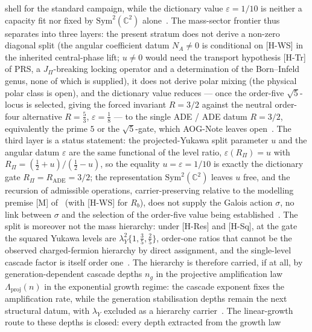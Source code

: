 \documentclass[11pt,a4paper]{article}
\begin{document}
    shell for the standard campaign,
    while the dictionary value $\varepsilon = 1/10$ is neither a capacity fit nor fixed by
    $\mathrm{Sym}^2(\mathbb{C}^2)$
    alone~\cite{Beau2026aar, Beau2026aog}.
    The mass-sector frontier thus separates into three layers: the present stratum does not derive a non-zero diagonal
    split (the angular coefficient datum $N_A \neq 0$ is conditional on [H-WS] in the inherited central-phase lift;
    $u \neq 0$ would need the transport hypothesis [H-Tr] of PRS, a $J_\Pi$-breaking locking operator and a
    determination of the Born--Infeld genus, none of which is supplied), it does not derive polar mixing (the physical polar class is
    open), and the
    dictionary value reduces --- once the order-five $\sqrt{5}$-locus is selected, giving the forced invariant $R = 3/2$
    against the neutral order-four alternative $R = \tfrac53$, $\varepsilon = \tfrac18$ --- to the single ADE /
    ADE datum $R = 3/2$, equivalently the prime $5$ or the $\sqrt{5}$-gate, which AOG-Note leaves open~\cite{Beau2026aog}.
    The third layer is a status statement: the projected-Yukawa split parameter $u$ and the angular datum
    $\varepsilon$ are the same functional of the level ratio, $\varepsilon(R_\Pi) = u$ with $R_\Pi =
    (\tfrac12+u)/(\tfrac12-u)$, so the equality $u = \varepsilon = 1/10$ is exactly the dictionary gate $R_\Pi =
    R_{\mathrm{ADE}} = 3/2$; the representation $\mathrm{Sym}^2(\mathbb{C}^2)$ leaves $u$ free, and the
    recursion of admissible operations, carrier-preserving relative to the modelling premise [M] of~\cite{Beau2026aog} (with [H-WS] for $R_b$), does not supply the Galois action $\sigma$, no link between $\sigma$ and the selection
    of the order-five value being established~\cite{Beau2026pyo, Beau2026aog}.
    The split is moreover not the mass hierarchy: under [H-Res] and [H-Sq], at the gate the squared Yukawa levels are
    $\lambda_Y^2\{1, \tfrac35, \tfrac25\}$, order-one ratios that cannot be the observed charged-fermion hierarchy by
    direct assignment, and the single-level cascade factor is itself order one~\cite{Beau2026a5}.
    The hierarchy is therefore carried, if at all, by generation-dependent cascade depths $n_g$ in the projective
    amplification law $\Lambda_{\mathrm{proj}}(n)$ in the exponential growth regime: the cascade exponent fixes the
    amplification rate, while the generation stabilisation depths remain the next structural datum, with $\lambda_Y$
    excluded as a hierarchy carrier~\cite{Beau2026pyo, Beau2026a5}.
    The linear-growth route to these depths is closed: every depth extracted from the growth law
\end{document}
